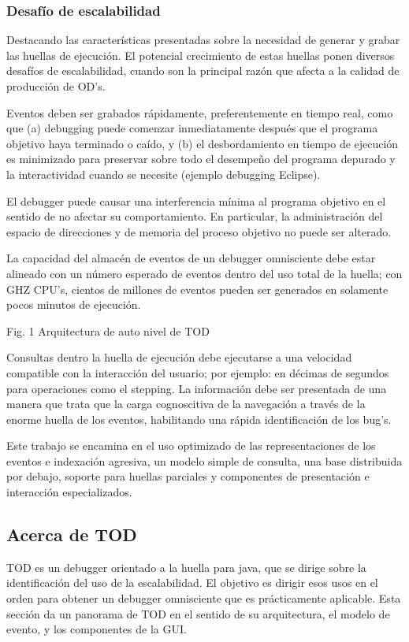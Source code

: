 \documentclass[12pt,a4paper]{report}
\begin{document}
			\subsubsection{Desafío de escalabilidad}

Destacando las características presentadas sobre la necesidad de generar y grabar las huellas de ejecución.  El potencial crecimiento de estas huellas ponen diversos desafíos de escalabilidad, cuando son la principal razón que afecta a la calidad de producción de OD's.

Eventos deben ser grabados rápidamente, preferentemente en tiempo real, como que  (a) debugging puede comenzar inmediatamente después que el programa objetivo haya terminado o caído, y (b) el desbordamiento en tiempo de ejecución es minimizado para preservar sobre todo el desempeño del programa depurado y la interactividad cuando se necesite (ejemplo debugging Eclipse).

El debugger puede causar una interferencia mínima al programa objetivo en el sentido de no afectar su comportamiento.  En particular, la administración del espacio de direcciones y de memoria del proceso objetivo no puede ser alterado.

La capacidad del almacén de eventos de un debugger omnisciente debe estar alineado con un número esperado de eventos dentro del uso total de la huella; con GHZ CPU's, cientos de millones de eventos pueden ser generados en solamente pocos minutos de ejecución.


Fig. 1 Arquitectura de auto nivel de TOD

Consultas dentro la huella de ejecución debe ejecutarse a una velocidad compatible con la interacción del usuario; por ejemplo: en décimas de segundos para operaciones como el stepping.
La información debe ser presentada de una manera que trata que la carga cognoscitiva de la navegación a través de la enorme huella de los eventos, habilitando una rápida identificación de los bug's.

 	Este trabajo se encamina en el uso optimizado de las representaciones de los eventos e indexación agresiva, un modelo simple de consulta, una base distribuida por debajo, soporte para huellas parciales y componentes de presentación e interacción especializados.

		\subsection{Acerca de TOD}

TOD es un debugger orientado a la huella para java, que se dirige sobre la identificación del uso de la escalabilidad.  El objetivo es dirigir esos usos en el orden para obtener un debugger omnisciente que es prácticamente aplicable.  Esta sección da un panorama de TOD en el sentido de su arquitectura, el modelo de evento, y los componentes de la GUI.
\end{document}
